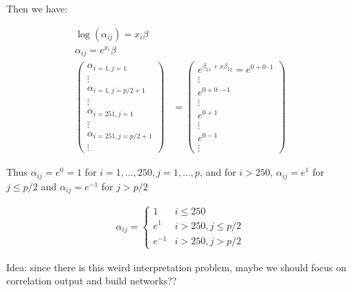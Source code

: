 \documentclass[10pt]{article}
\theoremstyle{definition}
\begin{document}
Then we have:

\begin{align*}
  \log(\alpha_{ij}) = x_i\beta \\
  \alpha_{ij} = e^{x_i}\beta\\
   \begin{pmatrix}\alpha_{i = 1, j = 1}\\\vdots \\
   \alpha_{i = 1, j = p/2+1}  \\ \vdots \\
   \alpha_{i = 251, j = 1} \\ \vdots \\ \alpha_{i = 251, j = p/2+1} \\ \vdots
 \end{pmatrix} &= \begin{pmatrix} e^{\beta_{11} + x \beta_{12}} = e^{0 + 0 \cdot 1} \\ \vdots \\ e^{0 + 0 \cdot -1} \\ \vdots \\ e^{0 + 1} \\ \vdots \\e^{0 - 1} \\ \vdots
\end{pmatrix}
\end{align*}

Thus $\alpha_{ij} = e^0 = 1$ for $i = 1, \ldots, 250, j = 1, \ldots , p$, and for $i > 250$, $\alpha_{ij} = e^1$ for $j \leq p/2$ and $\alpha_{ij}= e^{-1}$ for $j > p/2$

\begin{align*}
  \alpha_{ij} = \begin{cases}
  1   &   i \leq 250\\
  e^1   & i > 250, j \leq p/2\\
  e^{-1} & i > 250, j > p/2
  \end{cases}
\end{align*}


Idea: since there is this weird interpretation problem, maybe we should focus on correlation output and build networks??

\newpage
\printbibliography
\end{document}
